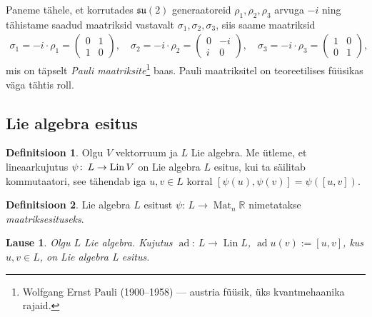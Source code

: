 \documentclass[12pt,a4paper,oneside]{article}
\theoremstyle{plain}
\newtheorem{lause}{Lause}[section]
\theoremstyle{definition}
\newtheorem{definitsioon}{Definitsioon}[section]
\numberwithin{equation}{section}
\def\R{{\mathbb R}}
\def\su2{{\mathfrak{ su}\left(2\right)}}
\DeclareMathOperator{\Mat}{Mat}
\DeclareMathOperator{\ad}{ad}
\DeclareMathOperator{\Lin}{Lin}
\begin{document}
Paneme tähele, et korrutades $\su2$ generaatoreid 
$\rho_1, \rho_2, \rho_3$ arvuga $-i$ ning tähistame saadud 
maatriksid vastavalt $\sigma_1, \sigma_2, \sigma_3$, siis saame 
maatriksid
\begin{align*}
\sigma_1 = -i \cdot \rho_1 = 
\begin{pmatrix} 0 & 1 \\ 1 & 0 \end{pmatrix}, \quad 
\sigma_2 = -i \cdot \rho_2 = 
\begin{pmatrix} 0 & -i \\ i & 0 \end{pmatrix},\quad 
\sigma_3 = -i \cdot \rho_3 = 
\begin{pmatrix} 1 & 0 \\ 0 & 1 \end{pmatrix},
\end{align*}
mis on täpselt \emph{Pauli maatriksite}\footnote{Wolfgang 
Ernst Pauli (1900--1958) --- austria füüsik, 
üks kvantmehaanika rajaid.} baas. Pauli maatriksitel on 
teoreetilises füüsikas väga tähtis roll.

\subsection{Lie algebra esitus}

\begin{definitsioon}
Olgu $V$ vektorruum ja $L$ Lie algebra. Me ütleme, et lineaar\-kujutus 
$\psi \colon\, L \rightarrow \nobreak \Lin V$ on Lie algebra $L$ esitus, 
kui ta säilitab kommutaatori, see tähendab iga $u, v \in L$ 
korral $\left[\psi\left(u\right), \psi\left(v\right)\right] = 
\psi\left(\left[u, v\right]\right)$. 
\end{definitsioon}

\begin{definitsioon}
Lie algebra $L$ esitust $\psi \colon\, L \rightarrow \Mat_n \R$ nimetatakse 
\emph{maatriksesituseks}.
\end{definitsioon}

\begin{lause} \label{lause:adjoint}
Olgu $L$ Lie algebra. Kujutus $\ad \colon\, L \rightarrow \Lin L$, 
$\ad u \left(v\right) := \left[u, v\right]$, kus $u,v \in L$, 
on Lie algebra L esitus.
\end{lause}
\end{document}
